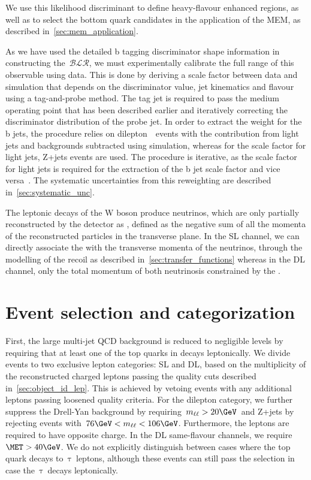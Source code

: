 We use this likelihood discriminant to define heavy-flavour enhanced regions, as well as to select the bottom quark candidates in the application of the MEM, as described in~\cref{sec:mem_application}. 

As we have used the detailed b tagging discriminator shape information in constructing the~$\mathcal{BLR}$, we must experimentally calibrate the full range of this observable using data. This is done by deriving a scale factor between data and simulation that depends on the discriminator value, jet kinematics and flavour using a tag-and-probe method. The tag jet is required to pass the medium operating point that has been described earlier and iteratively correcting the discriminator distribution of the probe jet. In order to extract the weight for the b jets, the procedure relies on dilepton~\ttbar~events with the contribution from light jets and backgrounds subtracted using simulation, whereas for the scale factor for light jets, Z+jets events are used. The procedure is iterative, as the scale factor for light jets is required for the extraction of the b jet scale factor and vice versa~\cite{CMS:2013sea,CMS-PAS-BTV-15-001}. The systematic uncertainties from this reweighting are described in~\cref{sec:systematic_unc}.

The leptonic decays of the W boson produce neutrinos, which are only partially reconstructed by the detector as \MET, defined as the negative sum of all the momenta of the reconstructed particles in the transverse plane. In the SL channel, we can directly associate the \MET with the transverse momenta of the neutrinos, through the modelling of the recoil as described in~\cref{sec:transfer_functions} whereas in the DL channel, only the total momentum of both neutrinosis  constrained by the \MET.

\section{Event selection and categorization}
\label{sec:event_selection}

First, the large multi-jet QCD background is reduced to negligible levels by requiring that at least one of the top quarks in \ttHbb decays leptonically. We divide events to two exclusive lepton categories: SL and DL, based on the multiplicity of the reconstructed charged leptons passing the quality cuts described in~\cref{sec:object_id_lep}. This is achieved by vetoing events with any additional leptons passing loosened quality criteria. For the dilepton category, we further suppress the Drell-Yan background by requiring~$m_{\ell\ell} > 20\GeV$~and Z+jets by rejecting events with~$76\GeV < m_{\ell\ell} < 106\GeV$. Furthermore, the leptons are required to have opposite charge. In the DL same-flavour channels, we require~$\MET > 40\GeV$. We do not explicitly distinguish between cases where the top quark decays to~$\mathrm{\tau}$~leptons, although these events can still pass the selection in case the~$\mathrm{\tau}$~decays leptonically.

